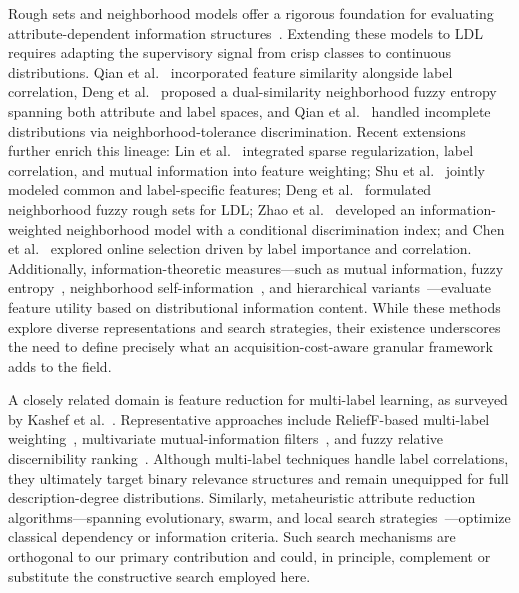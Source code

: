 Rough sets and neighborhood models offer a rigorous foundation for evaluating attribute-dependent information structures~\cite{CARS,NRS}. Extending these models to LDL requires adapting the supervisory signal from crisp classes to continuous distributions. Qian et al.~\cite{QX} incorporated feature similarity alongside label correlation, Deng et al.~\cite{DL} proposed a dual-similarity neighborhood fuzzy entropy spanning both attribute and label spaces, and Qian et al.~\cite{QD} handled incomplete distributions via neighborhood-tolerance discrimination. Recent extensions further enrich this lineage: Lin et al.~\cite{LW} integrated sparse regularization, label correlation, and mutual information into feature weighting; Shu et al.~\cite{Shu2024Specific} jointly modeled common and label-specific features; Deng et al.~\cite{Deng2025LDNF} formulated neighborhood fuzzy rough sets for LDL; Zhao et al.~\cite{Zhao2026IWNRS} developed an information-weighted neighborhood model with a conditional discrimination index; and Chen et al.~\cite{Chen2025OnlineLDL} explored online selection driven by label importance and correlation. Additionally, information-theoretic measures—such as mutual information, fuzzy entropy~\cite{QHM,WH2,XQ}, neighborhood self-information~\cite{WH1,XJ,JZ}, and hierarchical variants~\cite{LH}—evaluate feature utility based on distributional information content. While these methods explore diverse representations and search strategies, their existence underscores the need to define precisely what an acquisition-cost-aware granular framework adds to the field.

A closely related domain is feature reduction for multi-label learning, as surveyed by Kashef et al.~\cite{KP}. Representative approaches include ReliefF-based multi-label weighting~\cite{RM1}, multivariate mutual-information filters~\cite{LK}, and fuzzy relative discernibility ranking~\cite{QX2}. Although multi-label techniques handle label correlations, they ultimately target binary relevance structures and remain unequipped for full description-degree distributions. Similarly, metaheuristic attribute reduction algorithms—spanning evolutionary, swarm, and local search strategies~\cite{HX,NG,ZS,AE,OM}—optimize classical dependency or information criteria. Such search mechanisms are orthogonal to our primary contribution and could, in principle, complement or substitute the constructive search employed here.

